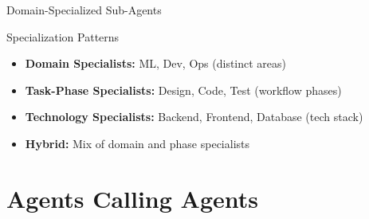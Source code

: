 \documentclass[aspectratio=169,11pt]{beamer}
\begin{document}
\begin{frame}{Domain-Specialized Sub-Agents}
    \vspace{0.3cm}
    \begin{exampleblock}{Specialization Patterns}
        \begin{itemize}
            \item \textbf{Domain Specialists:} ML, Dev, Ops (distinct areas)
            \item \textbf{Task-Phase Specialists:} Design, Code, Test (workflow phases)
            \item \textbf{Technology Specialists:} Backend, Frontend, Database (tech stack)
            \item \textbf{Hybrid:} Mix of domain and phase specialists
        \end{itemize}
    \end{exampleblock}
\end{frame}

\section{Agents Calling Agents}
\end{document}
